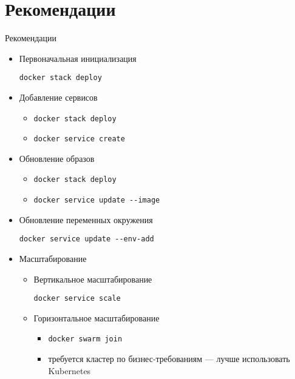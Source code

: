 \section{Рекомендации}\label{sec:recomendation}
\begin{frame}[fragile]{Рекомендации}

    \begin{itemize}
        \item Первоначальная инициализация

              {\small \texttt{docker stack deploy}}

        \item Добавление сервисов

              \begin{itemize}
                  \item \texttt{docker stack deploy}
                  \item \texttt{docker service create}
              \end{itemize}

        \item Обновление образов

              \begin{itemize}
                  \item \texttt{docker stack deploy}
                  \item \texttt{docker service update -{}-image}
              \end{itemize}

        \item Обновление переменных окружения

              \texttt{docker service update -{}-env-add }

        \item Масштабирование

              \begin{itemize}
                  \item Вертикальное масштабирование

                        \texttt{docker service scale}

                  \item Горизонтальное масштабирование
                        \begin{itemize}
                            \item {\color{gray}\texttt{docker swarm join}}
                            \item требуется кластер по бизнес-требованиям --- лучше использовать {\color{good}Kubernetes}
                        \end{itemize}
              \end{itemize}


    \end{itemize}

\end{frame}
